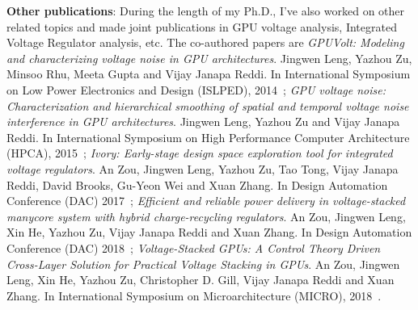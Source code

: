 \textbf{Other publications}: During the length of my Ph.D., I've also worked on other related topics and made joint publications in GPU voltage analysis, Integrated Voltage Regulator analysis, etc. The co-authored papers are \textit{GPUVolt: Modeling and characterizing voltage noise in GPU architectures}. Jingwen Leng, Yazhou Zu, Minsoo Rhu, Meeta Gupta and Vijay Janapa Reddi. In International Symposium on Low Power Electronics and Design (ISLPED), 2014~\cite{leng2014gpuvolt}; \textit{GPU voltage noise: Characterization and hierarchical smoothing of spatial and temporal voltage noise interference in GPU architectures}. Jingwen Leng, Yazhou Zu and Vijay Janapa Reddi. In International Symposium on High Performance Computer Architecture (HPCA), 2015~\cite{leng2015gpu}; \textit{Ivory: Early-stage design space exploration tool for integrated voltage regulators}. An Zou, Jingwen Leng, Yazhou Zu, Tao Tong, Vijay Janapa Reddi, David Brooks, Gu-Yeon Wei and Xuan Zhang. In Design Automation Conference (DAC) 2017~\cite{zou2017ivory}; \textit{Efficient and reliable power delivery in voltage-stacked manycore system with hybrid charge-recycling regulators}. An Zou, Jingwen Leng, Xin He, Yazhou Zu, Vijay Janapa Reddi and Xuan Zhang. In Design Automation Conference (DAC) 2018~\cite{zou2018efficient}; \textit{Voltage-Stacked GPUs: A Control Theory Driven Cross-Layer Solution for Practical Voltage Stacking in GPUs}. An Zou, Jingwen Leng, Xin He, Yazhou Zu, Christopher D. Gill, Vijay Janapa Reddi and Xuan Zhang. In International Symposium on Microarchitecture (MICRO), 2018~\cite{an2018control}.